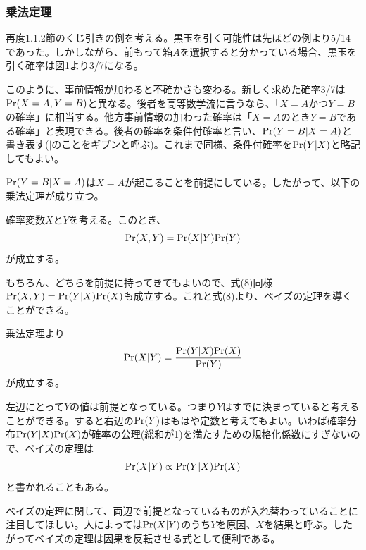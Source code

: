 \documentclass[dvipdfmx, 9pt, a4paper]{jsarticle}
\begin{document}
\subsubsection{乗法定理}
再度1.1.2節のくじ引きの例を考える。黒玉を引く可能性は先ほどの例より5/14であった。しかしながら、前もって箱$A$を選択すると分かっている場合、黒玉を引く確率は図1より3/7になる。\par
このように、事前情報が加わると不確かさも変わる。新しく求めた確率3/7は${\rm Pr}(X=A, Y=B)$と異なる。後者を高等数学流に言うなら、「$X=A$かつ$Y=B$の確率」に相当する。他方事前情報の加わった確率は「$X=A$のとき$Y=B$である確率」と表現できる。後者の確率を条件付確率と言い、${\rm Pr}(Y=B|X=A)$と書き表す($|$のことをギブンと呼ぶ)。これまで同様、条件付確率を${\rm Pr}(Y|X)$と略記してもよい。\par
${\rm Pr}(Y=B|X=A)$は$X=A$が起こることを前提にしている。したがって、以下の乗法定理が成り立つ。
\begin{tcolorbox}[title=乗法定理]
確率変数$X$と$Y$を考える。このとき、
\begin{equation}
{\rm Pr}(X, Y)={\rm Pr}(X|Y){\rm Pr}(Y)
\end{equation}
が成立する。
\end{tcolorbox}
もちろん、どちらを前提に持ってきてもよいので、式(8)同様${\rm Pr}(X,Y)={\rm Pr}(Y|X){\rm Pr}(X)$も成立する。これと式(8)より、ベイズの定理を導くことができる。
\begin{tcolorbox}[title=ベイズの定理]
乗法定理より
\begin{equation}
{\rm Pr}(X|Y)=\frac{{\rm Pr}(Y|X){\rm Pr}(X)}{{\rm Pr}(Y)}
\end{equation}
が成立する。
\end{tcolorbox}
左辺にとって$Y$の値は前提となっている。つまり$Y$はすでに決まっていると考えることができる。すると右辺の${\rm Pr}(Y)$はもはや定数と考えてもよい。いわば確率分布${\rm Pr}(Y|X){\rm Pr}(X)$が確率の公理(総和が1)を満たすための規格化係数にすぎないので、ベイズの定理は
\begin{equation}
{\rm Pr}(X|Y) \propto {\rm Pr}(Y|X){\rm Pr}(X)
\end{equation}
と書かれることもある。\par
ベイズの定理に関して、両辺で前提となっているものが入れ替わっていることに注目してほしい。人によっては${\rm Pr}(X|Y)$のうち$Y$を原因、$X$を結果と呼ぶ。したがってベイズの定理は因果を反転させる式として便利である。\bigskip
\end{document}
